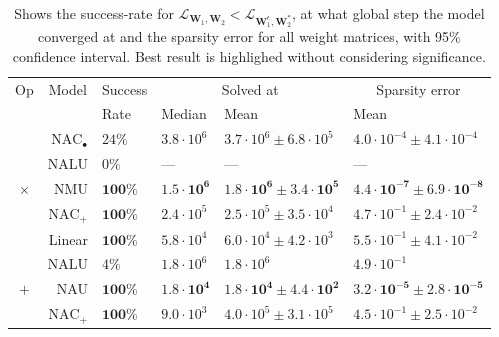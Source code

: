 \begin{table}[!h]

\caption{\label{tab:function-task-static-defaults}Shows the success-rate for $\mathcal{L}_{\mathbf{W}_1, \mathbf{W}_2} < \mathcal{L}_{\mathbf{W}_1^\epsilon, \mathbf{W}_2^*}$, at what global step the model converged at and the sparsity error for all weight matrices, with 95\% confidence interval. Best result is highlighed without considering significance.}
\centering
\begin{tabular}{crllll}
\toprule
\multicolumn{1}{c}{Op} & \multicolumn{1}{c}{Model} & \multicolumn{1}{c}{Success} & \multicolumn{2}{c}{Solved at} & \multicolumn{1}{c}{Sparsity error} \\
\cmidrule(l{3pt}r{3pt}){1-1} \cmidrule(l{3pt}r{3pt}){2-2} \cmidrule(l{3pt}r{3pt}){3-3} \cmidrule(l{3pt}r{3pt}){4-5} \cmidrule(l{3pt}r{3pt}){6-6}
 &  & Rate & Median & Mean & Mean\\
\midrule
 & $\mathrm{NAC}_{\bullet}$ & $24\%$ & $3.8 \cdot 10^{6}$ & $3.7 \cdot 10^{6} \pm 6.8 \cdot 10^{5}$ & $4.0 \cdot 10^{-4} \pm 4.1 \cdot 10^{-4}$\\

 & NALU & $0\%$ & --- & --- & ---\\

\multirow{-3}{*}{\centering\arraybackslash $\bm{\times}$} & NMU & $\mathbf{100\%}$ & $\mathbf{1.5 \cdot 10^{6}}$ & $\mathbf{1.8 \cdot 10^{6} \pm 3.4 \cdot 10^{5}}$ & $\mathbf{4.4 \cdot 10^{-7} \pm 6.9 \cdot 10^{-8}}$\\
\cmidrule{1-6}
 & $\mathrm{NAC}_{+}$ & $\mathbf{100\%}$ & $2.4 \cdot 10^{5}$ & $2.5 \cdot 10^{5} \pm 3.5 \cdot 10^{4}$ & $4.7 \cdot 10^{-1} \pm 2.4 \cdot 10^{-2}$\\

 & Linear & $\mathbf{100\%}$ & $5.8 \cdot 10^{4}$ & $6.0 \cdot 10^{4} \pm 4.2 \cdot 10^{3}$ & $5.5 \cdot 10^{-1} \pm 4.1 \cdot 10^{-2}$\\

 & NALU & $4\%$ & $1.8 \cdot 10^{6}$ & $1.8 \cdot 10^{6}$ & $4.9 \cdot 10^{-1}$\\

\multirow{-4}{*}{\centering\arraybackslash $\bm{+}$} & NAU & $\mathbf{100\%}$ & $\mathbf{1.8 \cdot 10^{4}}$ & $\mathbf{1.8 \cdot 10^{4} \pm 4.4 \cdot 10^{2}}$ & $\mathbf{3.2 \cdot 10^{-5} \pm 2.8 \cdot 10^{-5}}$\\
\cmidrule{1-6}
 & $\mathrm{NAC}_{+}$ & $\mathbf{100\%}$ & $9.0 \cdot 10^{3}$ & $4.0 \cdot 10^{5} \pm 3.1 \cdot 10^{5}$ & $4.5 \cdot 10^{-1} \pm 2.5 \cdot 10^{-2}$\\


\end{tabular}
\end{table}
